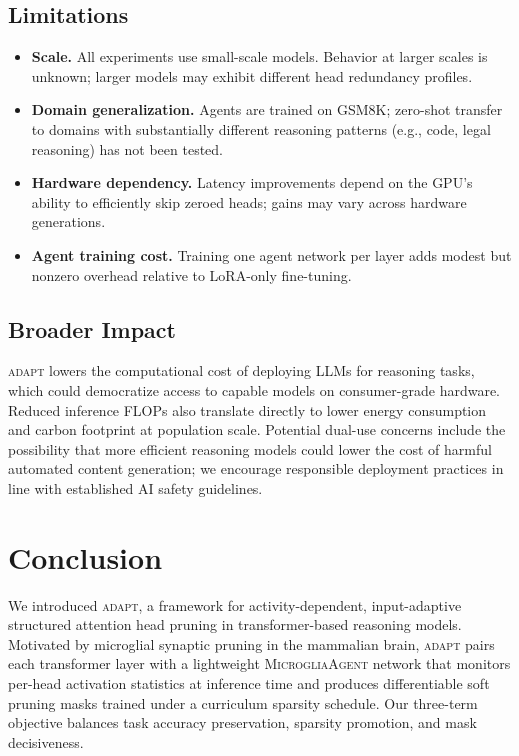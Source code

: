 \documentclass{article}
\newcommand{\agent}{\textsc{MicrogliaAgent}}
\newcommand{\system}{\textsc{adapt}}
\begin{document}
\subsection{Limitations}
\label{sec:disc_limitations}

\begin{itemize}
  \item \textbf{Scale.} All experiments use small-scale models. Behavior at larger scales
        is unknown; larger models may exhibit different head redundancy profiles.
  \item \textbf{Domain generalization.} Agents are trained on GSM8K; zero-shot transfer to
        domains with substantially different reasoning patterns (e.g., code, legal reasoning)
        has not been tested.
  \item \textbf{Hardware dependency.} Latency improvements depend on the GPU's ability to
        efficiently skip zeroed heads; gains may vary across hardware generations.
  \item \textbf{Agent training cost.} Training one agent network per layer adds modest but
        nonzero overhead relative to LoRA-only fine-tuning.
\end{itemize}

\subsection{Broader Impact}
\label{sec:disc_impact}

\system{} lowers the computational cost of deploying LLMs for reasoning tasks, which could
democratize access to capable models on consumer-grade hardware. Reduced inference FLOPs also
translate directly to lower energy consumption and carbon footprint at population scale.
Potential dual-use concerns include the possibility that more efficient reasoning models could
lower the cost of harmful automated content generation; we encourage responsible deployment
practices in line with established AI safety guidelines.

\section{Conclusion}
\label{sec:conclusion}

We introduced \system{}, a framework for activity-dependent, input-adaptive structured
attention head pruning in transformer-based reasoning models. Motivated by microglial synaptic
pruning in the mammalian brain, \system{} pairs each transformer layer with a lightweight
\agent{} network that monitors per-head activation statistics at inference time and produces
differentiable soft pruning masks trained under a curriculum sparsity schedule. Our three-term
objective balances task accuracy preservation, sparsity promotion, and mask decisiveness.
\end{document}
